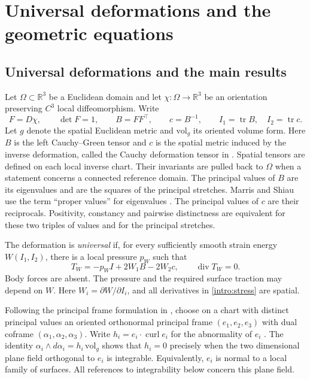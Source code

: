 \documentclass[11pt,a4paper]{article}
\numberwithin{equation}{section}
\theoremstyle{plain}
\theoremstyle{definition}
\theoremstyle{remark}
\begin{document}
\section{Universal deformations and the geometric equations}\label{fnd:secgeometry}\label{sec:geometry}

\subsection{Universal deformations and the main results}\label{sec:problem}

Let $\Omega\subset\mathbb R^3$ be a Euclidean domain and let
$\chi:\Omega\to\mathbb R^3$ be an orientation preserving $C^3$ local
diffeomorphism. Write
\begin{equation}\label{intro:kinematics}
 F=D\chi,\qquad \det F=1,\qquad
 B=FF^{\top},\qquad c=B^{-1},\qquad
 I_1=\operatorname{tr}B,\quad I_2=\operatorname{tr}c.
\end{equation}
Let $g$ denote the spatial Euclidean metric and $\mathrm{vol}_g$ its
oriented volume form.
Here $B$ is the left Cauchy--Green tensor and $c$ is the spatial metric
induced by the inverse deformation, called the Cauchy deformation tensor
in \cite{Kafadar1972}. Spatial tensors are defined on each
local inverse chart. Their invariants are pulled back to $\Omega$ when
a statement concerns a connected reference domain.
The principal values of $B$ are its eigenvalues and are the squares of
the principal stretches. Marris and Shiau use the term ``proper values''
for eigenvalues \cite{MarrisShiau1970}. The principal values of $c$ are
their reciprocals. Positivity, constancy and pairwise distinctness are
equivalent for these two triples of values and for the principal stretches.

The deformation is \emph{universal} if, for every sufficiently smooth
strain energy $W(I_1,I_2)$, there is a local pressure $p_W$ such that
\begin{equation}\label{intro:stress}
 T_W=-p_W I+2W_1B-2W_2c,\qquad \operatorname{div}T_W=0.
\end{equation}
Body forces are absent. The pressure and the required surface traction
may depend on $W$. Here $W_i=\partial W/\partial I_i$, and
all derivatives in \eqref{intro:stress} are spatial.

Following the principal frame formulation in
\cite{Marris1975,Marris1982}, choose on a chart with distinct principal
values an oriented orthonormal principal frame $(e_1,e_2,e_3)$ with dual
coframe $(\alpha_1,\alpha_2,\alpha_3)$. Write
$h_i=e_i\cdot\operatorname{curl}e_i$ for the abnormality of $e_i$
\cite[p.~112]{Marris1975}. The identity
$\alpha_i\wedge d\alpha_i=h_i\,\mathrm{vol}_g$ shows that $h_i=0$
precisely when the two dimensional plane field orthogonal to $e_i$
is integrable. Equivalently, $e_i$ is normal to a local family of
surfaces. All references to integrability below concern this plane
field.
\end{document}
